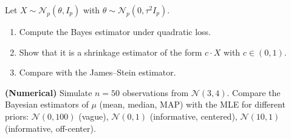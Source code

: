 \begin{exercise}
Let $X \sim \mathcal{N}_p(\theta, I_p)$ with
$\theta \sim \mathcal{N}_p(0, \tau^2 I_p)$.
\begin{enumerate}
  \item Compute the Bayes estimator under quadratic loss.
  \item Show that it is a shrinkage estimator of the form $c \cdot X$
        with $c \in (0,1)$.
  \item Compare with the James--Stein estimator.
\end{enumerate}
\end{exercise}

\begin{exercise}
\textbf{(Numerical)} Simulate $n = 50$ observations from
$\mathcal{N}(3, 4)$. Compare the Bayesian estimators of $\mu$ (mean,
median, MAP) with the MLE for different priors:
$\mathcal{N}(0, 100)$ (vague), $\mathcal{N}(0, 1)$ (informative,
centered), $\mathcal{N}(10, 1)$ (informative, off-center).
\end{exercise}
